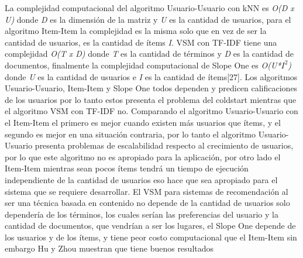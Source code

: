 \documentclass[12pt,letterpaper,openany]{book}
\begin{document}
La complejidad computacional del algoritmo Usuario-Usuario con kNN es \textit{O(D x U)} donde \textit{D} es la dimensión de la matriz y \textit{U} es la cantidad de usuarios, para el algoritmo Item-Item la complejidad es la misma solo que en vez de ser la cantidad de usuarios, es la cantidad de ítems \textit{I}.\cite{14}\cite{35} VSM con TF-IDF tiene una complejidad \textit{O(T x D)} donde \textit{T} es la cantidad de términos y \textit{D} es la  cantidad de documentos\cite{39}, finalmente la complejidad computacional de Slope One es \textit{O(U*$I^{2}$)} donde \textit{U} es la cantidad de usuarios e \textit{I} es la cantidad de ítems[27].
\vspace{5mm}\newline
Los algoritmos Usuario-Usuario, Item-Item y Slope One todos dependen y predicen calificaciones de los usuarios por lo tanto estos presenta el problema del coldstart mientras que el algoritmo VSM con TF-IDF no.
\vspace{5mm}\newline
Comparando el algoritmo Usuario-Usuario con el Item-Item el primero es mejor cuando existen más usuarios que ítems, y el segundo es mejor en una situación contraria, por lo tanto el algoritmo Usuario-Usuario presenta problemas de escalabilidad respecto al crecimiento de usuarios, por lo que este algoritmo no es apropiado para la aplicación, por otro lado el Item-Item mientras sean pocos ítems tendrá un tiempo de ejecución independiente de la cantidad de usuarios eso hace que sea apropiado para el sistema que se requiere desarrollar. El VSM para sistemas de recomendación al ser una técnica basada en contenido no depende de la cantidad de usuarios solo dependería de los términos, los cuales serían las preferencias del usuario y la cantidad de documentos, que vendrían a ser los lugares, el Slope One depende de los usuarios y de  los ítems, y tiene peor costo computacional que el Item-Item sin embargo Hu y Zhou muestran que tiene buenos resultados\cite{27}
\end{document}
